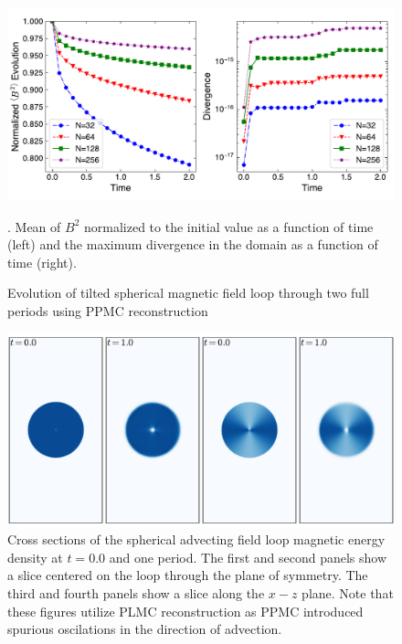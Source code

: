 \documentclass[modern]{aastex631}
\newcommand*{\img}[1]{%
    \raisebox{-.05\baselineskip}{%
        \texttt{[image: \#1]}%
    }%
}
\begin{document}
\begin{figure}[ht!]
    \includegraphics[width=\linewidth]{afl.pdf}
    \caption{Evolution of tilted spherical magnetic field loop through two full periods using PPMC reconstruction}. Mean of $B^2$ normalized to the initial value as a function of time (left) and the maximum divergence in the domain as a function of time (right). \href{https://zenodo.org/records/10927223}{\img{zenodo-gradient-200.png}}
    \label{fig:afl}
\end{figure}

\begin{figure}[ht!]
    \includegraphics[width=\linewidth]{afl_slices.pdf}
    \caption{Cross sections of the spherical advecting field loop magnetic energy density at $t=0.0$ and one period. The first and second panels show a slice centered on the loop through the plane of symmetry. The third and fourth panels show a slice along the $x-z$ plane. Note that these figures utilize PLMC reconstruction as PPMC introduced spurious oscilations in the direction of advection. \href{https://zenodo.org/records/10927223}{\img{zenodo-gradient-200.png}}}
    \label{fig:afl_slice}
\end{figure}
\end{document}
